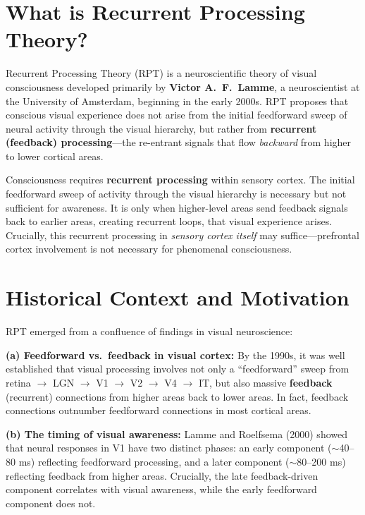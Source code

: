 \documentclass[11pt,a4paper]{report}
\begin{document}
\section{What is Recurrent Processing Theory?}

Recurrent Processing Theory (RPT) is a neuroscientific theory of visual consciousness developed primarily by \textbf{Victor A.\ F.\ Lamme}, a neuroscientist at the University of Amsterdam, beginning in the early 2000s. RPT proposes that conscious visual experience does not arise from the initial feedforward sweep of neural activity through the visual hierarchy, but rather from \textbf{recurrent (feedback) processing}---the re-entrant signals that flow \emph{backward} from higher to lower cortical areas.

\begin{definitionbox}
Consciousness requires \textbf{recurrent processing} within sensory cortex. The initial feedforward sweep of activity through the visual hierarchy is necessary but not sufficient for awareness. It is only when higher-level areas send feedback signals back to earlier areas, creating recurrent loops, that visual experience arises. Crucially, this recurrent processing in \emph{sensory cortex itself} may suffice---prefrontal cortex involvement is not necessary for phenomenal consciousness.
\end{definitionbox}

\section{Historical Context and Motivation}

RPT emerged from a confluence of findings in visual neuroscience:

\textbf{(a) Feedforward vs.\ feedback in visual cortex:} By the 1990s, it was well established that visual processing involves not only a ``feedforward'' sweep from retina $\to$ LGN $\to$ V1 $\to$ V2 $\to$ V4 $\to$ IT, but also massive \textbf{feedback} (recurrent) connections from higher areas back to lower areas. In fact, feedback connections outnumber feedforward connections in most cortical areas.

\textbf{(b) The timing of visual awareness:} Lamme and Roelfsema (2000) showed that neural responses in V1 have two distinct phases: an early component ($\sim$40--80 ms) reflecting feedforward processing, and a later component ($\sim$80--200 ms) reflecting feedback from higher areas. Crucially, the late feedback-driven component correlates with visual awareness, while the early feedforward component does not.
\end{document}
